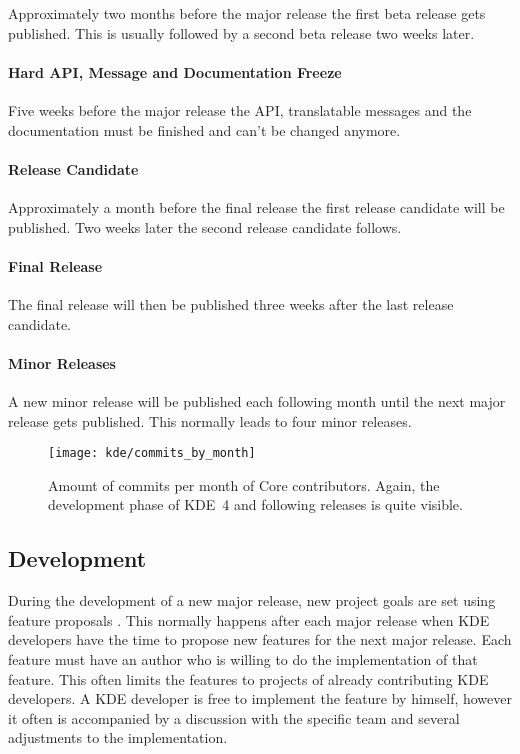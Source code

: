Approximately two months before the major release the first beta release gets
published. This is usually followed by a second beta release two weeks later.

\paragraph{Hard API, Message and Documentation Freeze}

Five weeks before the major release the \ac{API}, translatable messages and the
documentation must be finished and can't be changed anymore.

\paragraph{Release Candidate}

Approximately a month before the final release the first release candidate will
be published. Two weeks later the second release candidate follows.

\paragraph{Final Release}

The final release will then be published three weeks after the last release
candidate.

\paragraph{Minor Releases}

A new minor release will be published each following month until the next major
release gets published. This normally leads to four minor releases.

\begin{figure}[htbp]
  \centering
  \texttt{[image: kde/commits\_by\_month]}
  \caption{Amount of commits per month of Core contributors. Again, the
  development phase of KDE~4 and following releases is quite visible.}
\end{figure}


\subsection{Development} %

During the development of a new major release, new project goals are set using
feature proposals \cite{KDEDevelopmentModel,KDEFAQ}. This normally happens
after each major release when KDE developers have the time to propose new
features for the next major release. Each feature must have an author who is
willing to do the implementation of that feature. This often limits the
features to projects of already contributing KDE developers. A KDE developer is
free to implement the feature by himself, however it often is accompanied by a
discussion with the specific team and several adjustments to the
implementation.

